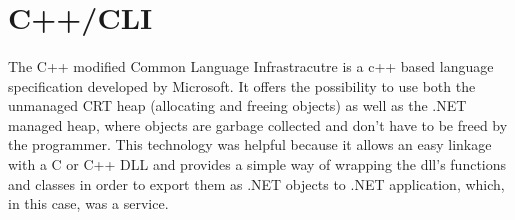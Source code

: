     \section{C++/CLI}
        \paragraph{}
        The C++ modified Common Language Infrastracutre is a c++ based language specification developed by Microsoft. It offers the possibility
        to use both the unmanaged CRT heap (allocating and freeing objects) as well as the .NET managed heap, where objects are garbage collected
        and don't have to be freed by the programmer. This technology was helpful because it allows an easy linkage with a C or C++ DLL and
        provides a simple way of wrapping the dll's functions and classes in order to export them as .NET objects to .NET application, which,
        in this case, was a service.



    
